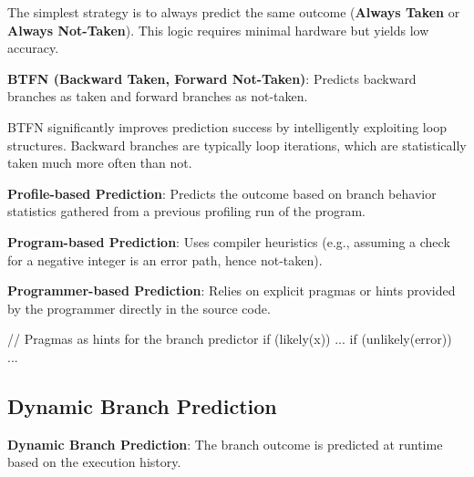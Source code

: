 \begin{remark}
    The simplest strategy is to always predict the same outcome (\textbf{Always Taken} or \textbf{Always Not-Taken}). This logic requires minimal hardware but yields low accuracy.
\end{remark}

\begin{definition}
    \textbf{BTFN (Backward Taken, Forward Not-Taken)}: Predicts backward branches as taken and forward branches as not-taken.
\end{definition}
\begin{remark}
    BTFN significantly improves prediction success by intelligently exploiting loop structures. Backward branches are typically loop iterations, which are statistically taken much more often than not.
\end{remark}

\begin{definition}
    \textbf{Profile-based Prediction}: Predicts the outcome based on branch behavior statistics gathered from a previous profiling run of the program.
\end{definition}

\begin{definition}
    \textbf{Program-based Prediction}: Uses compiler heuristics (e.g., assuming a check for a negative integer is an error path, hence not-taken).
\end{definition}

\begin{definition}
    \textbf{Programmer-based Prediction}: Relies on explicit pragmas or hints provided by the programmer directly in the source code.
\end{definition}

\begin{codeexample}
    // Pragmas as hints for the branch predictor
    if (likely(x)) {...}
    if (unlikely(error)) {...}
\end{codeexample}

\subsection{Dynamic Branch Prediction}

\begin{definition}
    \textbf{Dynamic Branch Prediction}: The branch outcome is predicted at runtime based on the execution history.
\end{definition}

